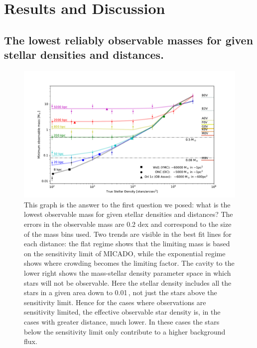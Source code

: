 \section{Results and Discussion}
\label{sec:results}

\subsection{The lowest reliably observable masses for given stellar densities and distances.}

\begin{figure}

    \centering
    \includegraphics[width=\textwidth]{images/old_trusted_mass}

    \caption{This graph is the answer to the first question we posed: what is the lowest observable mass for given stellar densities and distances? The errors in the observable mass are 0.2 dex and correspond to the size of the mass bins used. Two trends are visible in the best fit lines for each distance: the flat regime shows that the limiting mass is based on the sensitivity limit of MICADO, while the exponential regime shows where crowding becomes the limiting factor. The cavity to the lower right shows the mass-stellar density parameter space in which stars will not be observable. Here the stellar density includes all the stars in a given area down to 0.01\,\msun, not just the stars above the sensitivity limit. Hence for the cases where observations are sensitivity limited, the effective observable star density is, in the cases with greater distance, much lower. In these cases the stars below the sensitivity limit only contribute to a higher background flux. }
    
    \label{fig:trusted_mass}
    
\end{figure}

